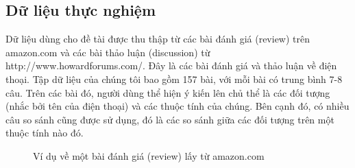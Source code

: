 \documentclass[12pt]{report}
\begin{document}
			\subsection*{Dữ liệu thực nghiệm}
				\par Dữ liệu dùng cho đề tài được thu thập từ các bài đánh giá (review) trên amazon.com và các bài thảo luận (discussion) từ http://www.howardforums.com/. Đây là các bài đánh giá và thảo luận về điện thoại. Tập dữ liệu của chúng tôi bao gồm 157 bài, với mỗi bài có trung bình 7-8 câu. Trên các bài đó, người dùng thể hiện ý kiến lên chủ thể là các đối tượng (nhắc bởi tên của điện thoại) và các thuộc tính của chúng. Bên cạnh đó, có nhiều câu so sánh cũng được sử dụng, đó là các so sánh giữa các đối tượng trên một thuộc tính nào đó.
				\begin{figure}[H]
					\centering				
					\noindent{}
					\caption{Ví dụ về một bài đánh giá (review) lấy từ amazon.com}
				\end{figure}
\end{document}
